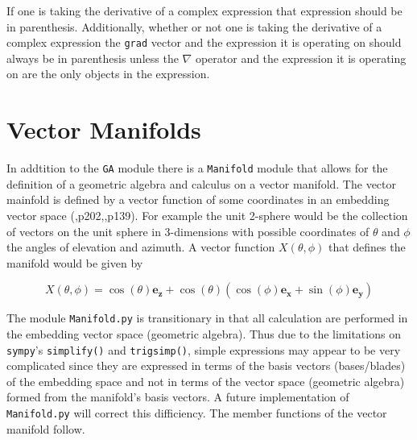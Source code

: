 \documentclass[10pt]{article}
\newcommand{\lp}{\left (}
\newcommand{\rp}{\right )}
\newcommand{\f}[2]{{#1}\lp {#2} \rp}
\newcommand{\paren}[1]{\lp {#1} \rp}
\newcommand{\T}[1]{\texttt{#1}}
\begin{document}
If one is taking the derivative of a complex expression that expression
should be in parenthesis.  Additionally, whether or not one is taking the
derivative of a complex expression the \T{grad} vector and the expression
it is operating on should always be in parenthesis unless the $\nabla$ operator
and the expression it is operating on are the only objects in the expression.

\section{Vector Manifolds}

In addtition to the \T{GA} module there is a \T{Manifold} module that allows
for the definition of a geometric algebra and calculus on a vector manifold.
The vector mainfold is defined by a vector function of some coordinates
in an embedding vector space (\cite{Doran},p202,\cite{Hestenes},p139).  For example the unit 2-sphere would be the
collection of vectors on the unit sphere in 3-dimensions with possible
coordinates of $\theta$ and $\phi$ the angles of elevation and
azimuth.  A vector function $\f{X}{\theta,\phi}$ that defines the manifold
would be given by

     \begin{equation}
        \f{X}{\theta,\phi} = \f{\cos}{\theta}\bm{e_{z}}+\f{\cos}{\theta}\paren{\f{\cos}{\phi}\bm{e_{x}}+\f{\sin}{\phi}\bm{e_{y}}}
     \end{equation}

The module \T{Manifold.py} is transitionary in that all calculation are performed in the embedding vector space (geometric algebra).
Thus due to the limitations on \T{sympy}'s \T{simplify()} and  \T{trigsimp()}, simple expressions may appear to be very complicated since they are expressed
in terms of the basis vectors (bases/blades) of the embedding space and not in terms of the vector space (geometric algebra) formed
from the manifold's basis vectors.  A future implementation of \T{Manifold.py} will correct this difficiency. The member functions of
the vector manifold follow.
\end{document}
